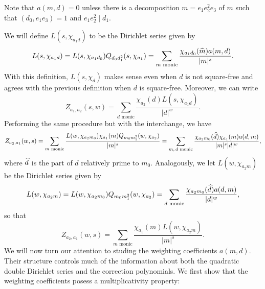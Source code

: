 \documentclass[12pt,reqno,oneside]{amsart}
\begin{document}
    \begin{remark}\label{rem:weighting_coefficient_remark}
        Note that $a(m,d) = 0$ unless there is a decomposition $m = e_{1}e_{2}^{2}e_{3}$ of $m$ such that $(d_{0},e_{1}e_{3}) = 1$ and $e_{1}e_{2}^{2} \mid d_{1}$.
    \end{remark}

    We will define $L(s,\chi_{a_{1}d})$ to be the Dirichlet series given by
    \[
        L(s,\chi_{a_{1}d}) = L(s,\chi_{a_{1}d_{0}})Q_{d_{0}d_{1}^{2}}(s,\chi_{a_{1}}) = \sum_{\text{$m$ monic}}\frac{\chi_{a_{1}d_{0}}(\widehat{m})a(m,d)}{|m|^{s}}.
    \]
    With this definition, $L(s,\chi_{d})$ makes sense even when $d$ is not square-free and agrees with the previous definition when $d$ is square-free. Moreover, we can write
    \[
        Z_{a_{1},a_{2}}(s,w) = \sum_{\text{$d$ monic}}\frac{\chi_{a_{2}}(d)L(s,\chi_{a_{1}d})}{|d|^{w}}.
    \]
    Performing the same procedure but with the interchange, we have
    \[
        Z_{a_{2},a_{1}}(w,s) = \sum_{\text{$m$ monic}}\frac{L(w,\chi_{a_{2}m_{0}})\chi_{a_{1}}(m)Q_{m_{0}m_{1}^{2}}(w,\chi_{a_{2}})}{|m|^{s}} = \sum_{\text{$m,d$ monic}}\frac{\chi_{a_{2}m_{0}}(\widehat{d})\chi_{a_{1}}(m)a(d,m)}{|m|^{s}|d|^{w}},
    \]
    where $\widehat{d}$ is the part of $d$ relatively prime to $m_{0}$. Analogously, we let $L(w,\chi_{a_{2}m})$ be the Dirichlet series given by
    \[
        L(w,\chi_{a_{2}m}) = L(w,\chi_{a_{2}m_{0}})Q_{m_{0}m_{1}^{2}}(w,\chi_{a_{2}}) = \sum_{\text{$d$ monic}}\frac{\chi_{a_{2}m_{0}}(\widehat{d})a(d,m)}{|d|^{w}},
    \]
    so that
    \[
        Z_{a_{2},a_{1}}(w,s) = \sum_{\text{$m$ monic}}\frac{\chi_{a_{1}}(m)L(w,\chi_{a_{2}m})}{|m|^{s}}.
    \]
    We will now turn our attention to studing the weighting coefficients $a(m,d)$. Their structure controls much of the information about both the quadratic double Dirichlet series and the correction polynomials. We first show that the weighting coefficients posess a multiplicativity property:
\end{document}
